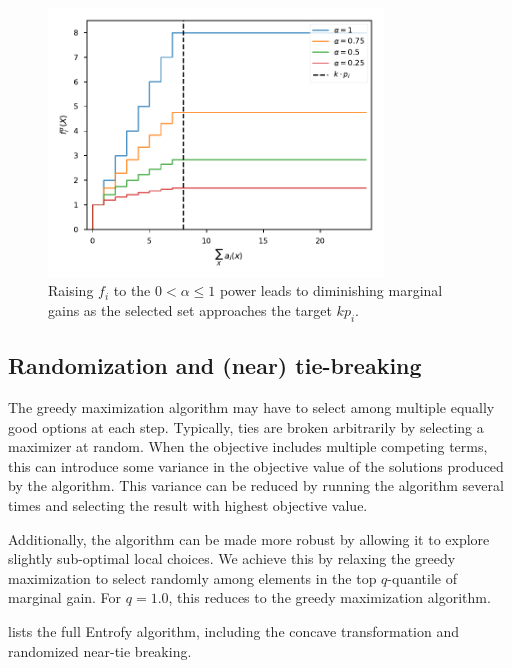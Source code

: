 \documentclass[10pt,letterpaper]{article}
\begin{document}
\begin{figure}
\begin{center}
\includegraphics[width=3.5in]{concave}
\caption{Raising $f_i$ to the $0 < \alpha \leq 1$ power leads to diminishing marginal gains as the selected set approaches the target $kp_i$.}
\label{fig:concave}
\end{center}
\end{figure}


\subsection*{Randomization and (near) tie-breaking}

The greedy maximization algorithm may have to select among multiple equally good options at each step.
Typically, ties are broken arbitrarily by selecting a maximizer at random.
When the objective includes multiple competing terms, this can introduce some variance in the objective value of the solutions produced by the algorithm.
This variance can be reduced by running the algorithm several times and selecting the result with highest objective value.

Additionally, the algorithm can be made more robust by allowing it to explore slightly sub-optimal local choices. We achieve this by relaxing the greedy maximization to select randomly among elements in the top $q$-quantile of marginal gain. For $q=1.0$, this reduces to the greedy maximization algorithm.

 lists the full Entrofy algorithm, including the concave transformation and randomized near-tie breaking.
\end{document}
